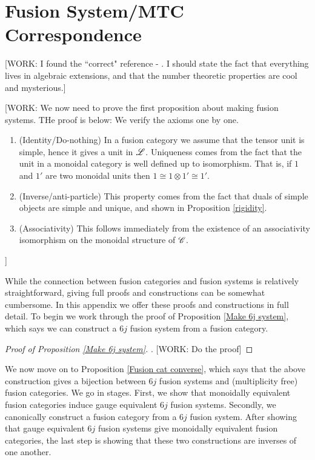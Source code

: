 \documentclass{article}
\theoremstyle{definition}
\numberwithin{figure}{section}
\begin{document}
\section{Fusion System/MTC Correspondence}
\label{Fusion System/MTC correspondence}

[WORK: I found the ``correct" reference - \cite{davidovich2013arithmetic}. I should state the fact that everything lives in algebraic extensions, and that the number theoretic properties are cool and mysterious.]

[WORK: We now need to prove the first proposition about making fusion systems. THe proof is below:
We verify the axioms one by one.

\begin{enumerate}
\item (Identity/Do-nothing) In a fusion category we assume that the tensor unit is simple, hence it gives a unit in $\mathscr{L}$. Uniqueness comes from the fact that the unit in a monoidal category is well defined up to isomorphism. That is, if $1$ and $1'$ are two monoidal units then $1\cong 1\otimes 1'\cong 1'$.

\item (Inverse/anti-particle) This property comes from the fact that duals of simple objects are simple and unique, and shown in Proposition \ref{rigidity}. 

\item (Associativity) This follows immediately from the existence of an associativity isomorphism on the monoidal structure of $\mathscr{C}$.
\end{enumerate}]

While the connection between fusion categories and fusion systems is relatively straightforward, giving full proofs and constructions can be somewhat cumbersome. In this appendix we offer these proofs and constructions in full detail. To begin we work through the proof of Proposition \ref{Make 6j system}, which says we can construct a $6j$ fusion system from a fusion category.

\begin{proof}[Proof of Proposition \ref{Make 6j system}]. [WORK: Do the proof]
\end{proof}


We now move on to Proposition \ref{Fusion cat converse}, which says that the above construction gives a bijection between $6j$ fusion systems and (multiplicity free) fusion categories. We go in stages. First, we show that monoidally equivalent fusion categories induce gauge equivalent $6j$ fusion systems. Secondly, we canonically construct a fusion category from a $6j$ fusion system. After showing that gauge equivalent $6j$ fusion systems give monoidally equivalent fusion categories, the last step is showing that these two constructions are inverses of one another.
\end{document}
